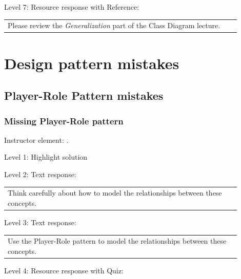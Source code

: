 \noindent Level 7: Resource response with Reference: \medskip

\begin{tabular}{|p{0.9\linewidth}}
Please review the \textit{Generalization} part of the Class Diagram lecture.
\end{tabular} \medskip




\section{Design pattern mistakes}

\subsection{Player-Role Pattern mistakes}

\subsubsection{Missing Player-Role pattern}

Instructor element: . \medskip

\noindent Level 1: Highlight solution  \medskip

\noindent Level 2: Text response: \medskip

\begin{tabular}{|p{0.9\linewidth}}
Think carefully about how to model the relationships between these concepts.
\end{tabular} \medskip

\noindent Level 3: Text response: \medskip

\begin{tabular}{|p{0.9\linewidth}}
Use the Player-Role pattern to model the relationships between these concepts.
\end{tabular} \medskip

\noindent Level 4: Resource response with Quiz: \medskip


